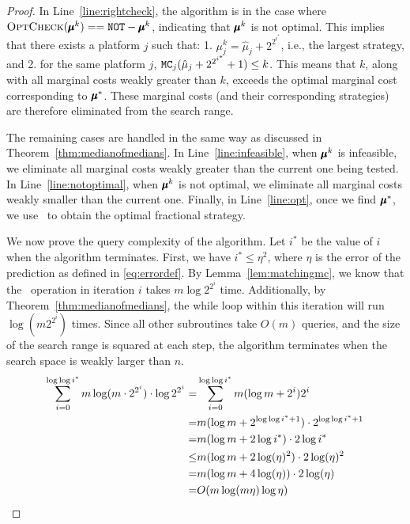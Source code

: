 \begin{proof}
In Line~\ref{line:rightcheck}, the algorithm is in the case where \( \textsc{OptCheck}(\pmb{\mu}^k) == \texttt{NOT}-\pmb{\mu}^k \), indicating that \( \pmb{\mu}^k \) is not optimal. This implies that there exists a platform \( j \) such that: 
1. \( \mu^k_j = \hat{\mu}_j + 2^{2^{i^*}} \), i.e., the largest strategy, and 
2. for the same platform \( j \), \( \texttt{MC}_j(\hat{\mu}_j + 2^{2^{i^*}}+1) \leq k \). 
This means that \( k \), along with all marginal costs weakly greater than \( k \), exceeds the optimal marginal cost corresponding to \( \pmb{\mu}^* \). These marginal costs (and their corresponding strategies) are therefore eliminated from the search range.

The remaining cases are handled in the same way as discussed in Theorem~\ref{thm:medianofmedians}. In Line~\ref{line:infeasible}, when \( \pmb{\mu}^k \) is infeasible, we eliminate all marginal costs weakly greater than the current one being tested. In Line~\ref{line:notoptimal}, when \( \pmb{\mu}^k \) is not optimal, we eliminate all marginal costs weakly smaller than the current one. Finally, in Line~\ref{line:opt}, once we find \( \pmb{\mu}^* \), we use \roundup\ to obtain the optimal fractional strategy.

We now prove the query complexity of the algorithm. Let \( i^* \) be the value of \( i \) when the algorithm terminates. First, we have \( i^* \leq \eta^2 \), where \( \eta \) is the error of the prediction as defined in \eqref{eq:errordef}. By Lemma~\ref{lem:matchingmc}, we know that the \matchingmc\ operation in iteration \( i \) takes \( m \log 2^{2^i} \) time. Additionally, by Theorem~\ref{thm:medianofmedians}, the while loop within this iteration will run \( \log (m 2^{2^i}) \) times. Since all other subroutines take \( O(m) \) queries, and the size of the search range is squared at each step, the algorithm terminates when the search space is weakly larger than \( n \).
{\allowdisplaybreaks
\begin{align*}
    \sum_{i = 0}^{\log \log i^*} m \log (m \cdot 2^{2^i}) \cdot \log 2^{2^i} 
    =& \sum_{i = 0}^{\log \log i^*} m (\log m + 2^i) 2^i\\
    =& m (\log m + 2^{\log \log i^*+1}) \cdot 2^{\log \log i^* +1}\\
     =& m (\log m + 2 \log i^*) \cdot 2 \log i^*\\
     \leq& m (\log m + 2 \log (\eta)^2) \cdot 2 \log (\eta)^2\\
     =& m (\log m +4\log (\eta)) \cdot 2 \log (\eta)\\
     =& O(m \log(m \eta)\log \eta)\qedhere
\end{align*}}
\end{proof}

